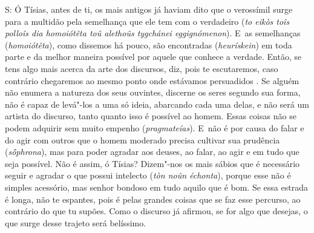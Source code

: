 S: Ó Tísias, antes de ti, os mais antigos já haviam dito que o
verossímil surge para a multidão pela semelhança que ele tem com o
verdadeiro (\emph{to eikòs toîs polloîs dia homoiótêta toû alethoûs
tygchánei eggignómenon}). E~as semelhanças (\emph{homoiótêta}), como
dissemos há pouco, são encontradas (\emph{heurískein}) em toda parte e
da melhor maneira possível por aquele que conhece a verdade. Então, se
tens algo mais acerca da arte dos discursos, diz, pois te escutaremos,
caso contrário chegaremos ao mesmo ponto onde estávamos persuadidos
\bekker{[273e]}. Se alguém não enumera a natureza dos seus ouvintes, discerne
os seres segundo sua forma, não é capaz de levá"-los a uma só ideia,
abarcando cada uma delas, e não será um artista do discurso, tanto
quanto isso é possível ao homem. Essas coisas não se podem adquirir sem
muito empenho (\emph{pragmateías}). E~não é por causa do falar e do agir
com outros que o homem moderado precisa cultivar sua prudência
(\emph{sṓphrona}), mas para poder agradar aos deuses, ao falar, ao agir
e em tudo que seja possível. Não é assim, ó Tísias? Dizem"-nos os mais
sábios que é necessário seguir e agradar o que possui intelecto
(\emph{tòn noûn échonta}), \bekker{[274a]} porque esse não é simples
acessório, mas senhor bondoso em tudo aquilo que é bom. Se essa estrada
é longa, não te espantes, pois é pelas grandes coisas que se faz esse
percurso, ao contrário do que tu supões. Como o discurso já afirmou, se
for algo que desejas, o que surge desse trajeto será
belíssimo.

